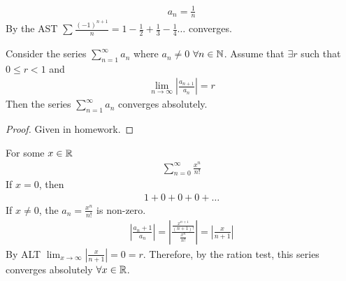\begin{eg}
	\begin{align}
		a_n = \frac{1}{n}
	\end{align}
	By the AST $\sum_{}^{} \frac{\left( -1 \right)^{n+1}}{n} = 1 - \frac{1}{2} + \frac{1}{3} - \frac{1}{4} \ldots$ converges.
\end{eg}

\begin{theorem}
	Consider the series $\sum_{n=1}^{\infty} a_n$ where $a_n \neq 0$ $\forall n \in \mathbb{N}$. Assume that $\exists r$ such that $0 \le r < 1$ and
	\begin{align}
		\lim_{n \to \infty} \left|\frac{a_{n+1}}{a_n}\right| = r
	\end{align}
	Then the series $\sum_{n=1}^{\infty} a_n$ converges absolutely.
\end{theorem}

\begin{proof}
	Given in homework.
\end{proof}

\begin{eg}
	For some $x \in \mathbb{R}$
	\begin{align}
		\sum_{n= 0}^{\infty} \frac{x^{n}}{n!}
	\end{align}
	If $x=0$, then
	\begin{align}
		1 + 0 + 0 + 0 + \ldots
	\end{align}
	If $x \neq 0$, the $a_n = \frac{x^{n}}{n!}$ is non-zero.
	\begin{align}
		\left|\frac{a_n+1}{a_n}\right| = \left| \frac{\frac{x^{n+1}}{\left( n+1 \right)!}}{\frac{x^{n}}{n!}} \right| = \left|\frac{x}{n+1}\right|
	\end{align}
	By ALT $\lim_{x \to \infty} \left|\frac{x}{n+1}\right| = 0 = r$. Therefore, by the ration test, this series converges absolutely $\forall x \in \mathbb{R}$.
\end{eg}














